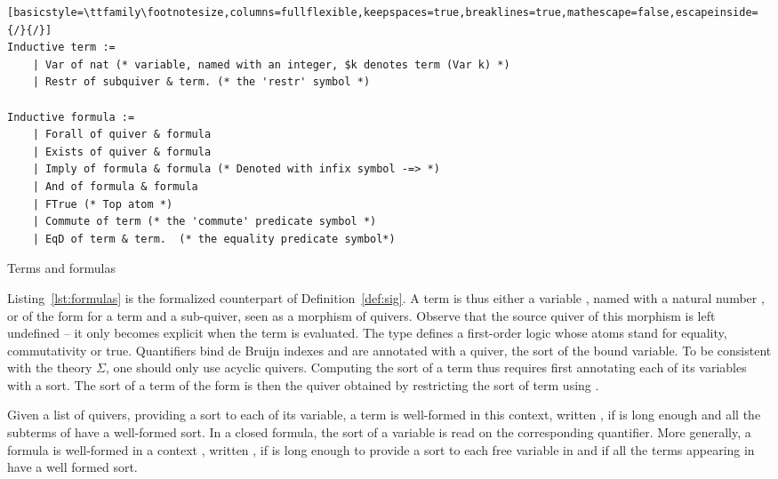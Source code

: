 \begin{listing}[!t]
\begin{lstlisting}[basicstyle=\ttfamily\footnotesize,columns=fullflexible,keepspaces=true,breaklines=true,mathescape=false,escapeinside={/}{/}]
Inductive term :=
    | Var of nat (* variable, named with an integer, $k denotes term (Var k) *)
    | Restr of subquiver & term. (* the 'restr' symbol *)

Inductive formula :=
    | Forall of quiver & formula
    | Exists of quiver & formula
    | Imply of formula & formula (* Denoted with infix symbol -=> *)
    | And of formula & formula
    | FTrue (* Top atom *)
    | Commute of term (* the 'commute' predicate symbol *)
    | EqD of term & term.  (* the equality predicate symbol*)
\end{lstlisting}
\caption{Terms and formulas}
\label{lst:formulas}
\end{listing}

Listing~\ref{lst:formulas} is the formalized counterpart of Definition~\ref{def:sig}. A term  is thus either a variable , named with a natural number , or of the form  for  a term and  a sub-quiver, seen as a morphism of quivers. Observe that the source quiver of this morphism is left undefined -- it only becomes explicit when the term is evaluated. The type  defines a first-order logic whose atoms stand for equality, commutativity or true. Quantifiers bind de Bruijn indexes and are annotated with a quiver, the sort of the bound variable. To be consistent with the theory $\Sigma$, one should only use acyclic quivers. Computing the sort of a term thus requires first annotating each of its variables with a sort. The sort of  a term of the form  is then the quiver obtained by restricting the sort of term  using .

Given a list  of quivers, providing a sort to each of its variable, a term  is well-formed in this context, written , if  is long enough and all the subterms of  have a well-formed sort. In a closed formula, the sort of a variable is read on the corresponding quantifier. More generally, a formula  is well-formed in a context , written , if  is long enough to provide a sort to each free variable in  and if all the terms appearing in  have a well formed sort.

